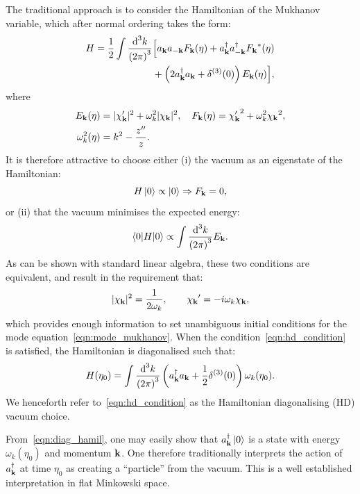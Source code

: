 The traditional approach is to consider the Hamiltonian of the Mukhanov variable, which after normal ordering takes the form:
\begin{align}
  H = \frac{1}{2}\int\frac{\d[3]{k}}{{(2\pi)}^3} 
  &\Big[ a_\vk a_{-\vk} F_\vk(\eta) + a_\vk^\dagger a_{-\vk}^\dagger \str{F_\vk}(\eta) \nonumber \\
  &+ \left(2a_\vk^\dagger a_\vk + \delta^{(3)}(0)\right)E_\vk(\eta) \Big], 
\end{align}
where
\begin{align}
  E_\vk(\eta) &= |\chi_\vk^\prime|^2 + \omega_k^2|\chi_\vk|^2,\quad
  F_\vk(\eta) = {\chi_\vk^\prime}^2 + \omega_k^2{\chi_\vk}^2,\\
  \omega_k^2(\eta) &= k^2-\frac{\dprm{z}}{z}.
  \label{eqn:def_omega}
\end{align}
It is therefore attractive to choose either (i) the vacuum as an eigenstate of the Hamiltonian:
\begin{equation}
  H\ket{0}\propto\ket{0} \Rightarrow F_\vk=0,
  \label{eqn:eigenstate}
\end{equation}
or (ii) that the vacuum minimises the expected energy:
\begin{equation}
  \bracket{0}{H}{0} \propto \int \frac{\d[3]{k}}{{(2\pi)}^3} E_\vk.
  \label{eqn:hamil}
\end{equation}
As can be shown with standard linear algebra, these two conditions are equivalent, and result in the requirement that:
\begin{equation}
  |\chi_\vk|^2 = \frac{1}{2\omega_k}, \qquad \prm{\chi_\vk} = -i \omega_k \chi_\vk,
  \label{eqn:hd_condition}
\end{equation}
which provides enough information to set unambiguous initial conditions for the mode equation~\eqref{eqn:mode_mukhanov}.
When the condition~\eqref{eqn:hd_condition} is satisfied, the Hamiltonian is diagonalised such that:
\begin{equation}
  H(\eta_0) = \int\frac{\d[3]{k}}{{(2\pi)}^3} 
  \left(a_\vk^\dagger a_\vk + \frac{1}{2}\delta^{(3)}(0)\right)\omega_k(\eta_0). 
  \label{eqn:diag_hamil}
\end{equation}
We henceforth refer to~\eqref{eqn:hd_condition} as the Hamiltonian diagonalising (HD) vacuum choice.

From~\eqref{eqn:diag_hamil}, one may easily show that \(a_\vk^\dagger\ket{0}\) is a state with energy \(\omega_k(\eta_0)\) and momentum \(\vk\). One therefore traditionally interprets the action of \(a_\vk^\dagger\) at time \(\eta_0\) as creating a ``particle'' from the vacuum. This is a well established interpretation in flat Minkowski space. %

